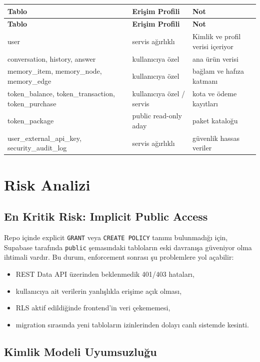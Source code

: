 \documentclass[12pt,a4paper]{article}
\begin{document}
\begin{longtable}{@{}p{}p{}p{}@{}}
\toprule
\textbf{Tablo} & \textbf{Erişim Profili} & \textbf{Not} \\
\midrule
\endfirsthead
\toprule
\textbf{Tablo} & \textbf{Erişim Profili} & \textbf{Not} \\
\midrule
\endhead
user & servis ağırlıklı & Kimlik ve profil verisi içeriyor \\
conversation, history, answer & kullanıcıya özel & ana ürün verisi \\
memory\_item, memory\_node, memory\_edge & kullanıcıya özel & bağlam ve hafıza katmanı \\
token\_balance, token\_transaction, token\_purchase & kullanıcıya özel / servis & kota ve ödeme kayıtları \\
token\_package & public read-only aday & paket kataloğu \\
user\_external\_api\_key, security\_audit\_log & servis ağırlıklı & güvenlik hassas veriler \\
\bottomrule
\end{longtable}

\section{Risk Analizi}

\subsection{En Kritik Risk: Implicit Public Access}

Repo içinde explicit \texttt{GRANT} veya \texttt{CREATE POLICY} tanımı bulunmadığı için, Supabase tarafında \texttt{public} şemasındaki tabloların eski davranışa güveniyor olma ihtimali vardır. Bu durum, enforcement sonrası şu problemlere yol açabilir:

\begin{itemize}[leftmargin=2em, itemsep=4pt]
	\item REST Data API üzerinden beklenmedik 401/403 hataları,
	\item kullanıcıya ait verilerin yanlışlıkla erişime açık olması,
	\item RLS aktif edildiğinde frontend'in veri çekememesi,
	\item migration sırasında yeni tabloların izinlerinden dolayı canlı sistemde kesinti.
\end{itemize}

\subsection{Kimlik Modeli Uyumsuzluğu}
\end{document}
